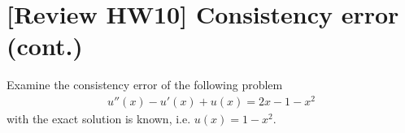 \documentclass[12pt]{article}
\begin{document}
\section{[Review HW10] Consistency error (cont.)}
\begin{example}
	Examine the consistency error of the following problem
	\begin{align*}
		u''(x) - u'(x) + u(x) = 2x -1 -x^2
	\end{align*}
	with the exact solution is known, i.e. $u(x) = 1-x^2$.
\end{example}

\newpage
\end{document}
